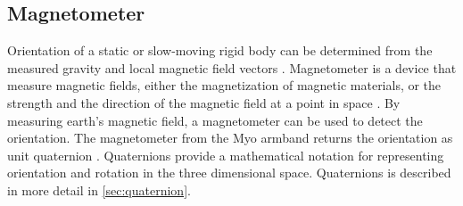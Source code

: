 \subsection{Magnetometer}
Orientation of a static or slow-moving rigid body can be determined from the measured gravity and local magnetic field vectors \cite{yun2008simplified}. Magnetometer is a device that measure magnetic fields, either the magnetization of magnetic materials, or the strength and the direction of the magnetic field at a point in space \cite{wiki:Magnetometer}. By measuring earth's magnetic field, a magnetometer can be used to detect the orientation. The magnetometer from the Myo armband returns the orientation as unit quaternion \cite{myoSDK}. Quaternions provide a mathematical notation for representing orientation and rotation in the three dimensional space. Quaternions is described in more detail in \cref{sec:quaternion}.
 
